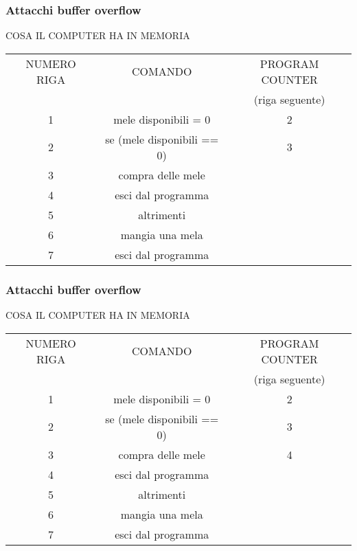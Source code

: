 \documentclass[italian,aspectratio=169]{beamer}
\begin{document}
\begin{frame}
 \frametitle{Attacchi buffer overflow}
 COSA IL COMPUTER HA IN MEMORIA
 \begin{center}
 \begin{tabular}{|c|c|c|}
\hline 
{NUMERO RIGA} & {COMANDO} & {PROGRAM COUNTER}\tabularnewline
{}&{}&{(riga seguente)}\tabularnewline
\hline 
\hline 
{1} & {mele disponibili = 0} & {2}\tabularnewline
\hline
{2} & {se (mele disponibili == 0)} & {3}\tabularnewline
\hline
{3} & {compra delle mele} & {}\tabularnewline
\hline
{4} & {esci dal programma} & {}\tabularnewline
\hline
{5} & {altrimenti} & {}\tabularnewline
\hline
{6} & {mangia una mela} & {}\tabularnewline
\hline
{7} & {esci dal programma} & {}\tabularnewline
\hline 
\end{tabular}
\end{center}
\end{frame}



\begin{frame}
 \frametitle{Attacchi buffer overflow}
 COSA IL COMPUTER HA IN MEMORIA
 \begin{center}
 \begin{tabular}{|c|c|c|}
\hline 
{NUMERO RIGA} & {COMANDO} & {PROGRAM COUNTER}\tabularnewline
{}&{}&{(riga seguente)}\tabularnewline
\hline 
\hline 
{1} & {mele disponibili = 0} & {2}\tabularnewline
\hline
{2} & {se (mele disponibili == 0)} & {3}\tabularnewline
\hline
{3} & {compra delle mele} & {4}\tabularnewline
\hline
{4} & {esci dal programma} & {}\tabularnewline
\hline
{5} & {altrimenti} & {}\tabularnewline
\hline
{6} & {mangia una mela} & {}\tabularnewline
\hline
{7} & {esci dal programma} & {}\tabularnewline
\hline 
\end{tabular}
\end{center}
\end{frame}
\end{document}
